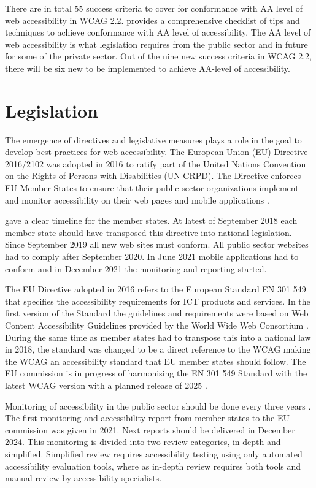 There are in total 55 success criteria to cover for conformance with AA level of web accessibility in WCAG 2.2. \textcite{wcag_checklist} provides a comprehensive checklist of tips and techniques to achieve conformance with AA level of accessibility. The AA level of web accessibility is what legislation requires from the public sector and in future for some of the private sector.  Out of the nine new success criteria in WCAG 2.2, there will be six new to be implemented to achieve AA-level of accessibility.


\section{Legislation}

The emergence of directives and legislative measures plays a role in the goal to develop best practices for web accessibility. The European Union (EU) Directive 2016/2102 was adopted in 2016 to ratify part of the United Nations Convention on the Rights of Persons with Disabilities (UN CRPD). The Directive enforces EU Member States to ensure that their public sector organizations implement and monitor accessibility on their web pages and mobile applications \citep{eudirective2016}. 

\textcite{eudirective2016} gave a clear timeline for the member states. At latest of September 2018 each member state should have transposed this directive into national legislation. Since September 2019 all new web sites must conform. All public sector websites had to comply after September 2020. In June 2021 mobile applications had to conform and in December 2021 the monitoring and reporting started. 

The EU Directive adopted in 2016 refers to the European Standard EN 301 549 that specifies the accessibility requirements for ICT products and services. In the first version of the Standard the guidelines and requirements were based on Web Content Accessibility Guidelines provided by the World Wide Web Consortium \citep{wcagadoptioneurope}. During the same time as member states had to transpose this into a national law in 2018, the standard was changed to be a direct reference to the WCAG making the WCAG an accessibility standard that EU member states should follow. The EU commission is in progress of harmonising the EN 301 549 Standard with the latest WCAG version with a planned release of 2025 \citep{etsi_standard}.

Monitoring of accessibility in the public sector should be done every three years \citep{eudirectivemonitoring}. The first monitoring and accessibility report from member states to the EU commission was given in 2021. Next reports should be delivered in December 2024. This monitoring is divided into two review categories, in-depth and simplified. Simplified review requires accessibility testing using only automated accessibility evaluation tools, where as in-depth review requires both tools and manual review by accessibility specialists. 

